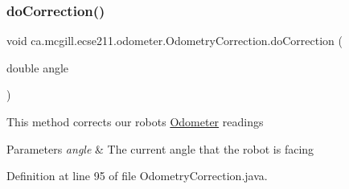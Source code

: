 \subsubsection{\texorpdfstring{do\+Correction()}{doCorrection()}}
{\footnotesize\ttfamily void ca.\+mcgill.\+ecse211.\+odometer.\+Odometry\+Correction.\+do\+Correction (\begin{DoxyParamCaption}\item[{double}]{angle }\end{DoxyParamCaption})}

This method corrects our robot\textquotesingle{}s \hyperlink{classca_1_1mcgill_1_1ecse211_1_1odometer_1_1_odometer}{Odometer} readings


\begin{DoxyParams}{Parameters}
{\em angle} & The current angle that the robot is facing \\
\hline
\end{DoxyParams}


Definition at line 95 of file Odometry\+Correction.\+java.


